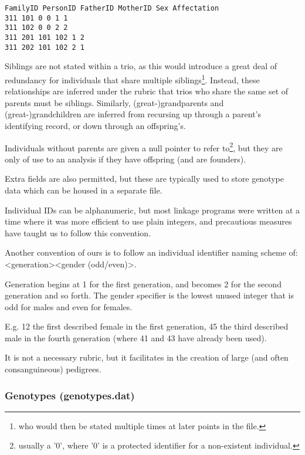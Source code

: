 \begingroup
\begin{lstlisting}[label=verb:pedfile]
FamilyID PersonID FatherID MotherID Sex Affectation
311 101 0 0 1 1
311 102 0 0 2 2
311 201 101 102 1 2
311 202 101 102 2 1
\end{lstlisting}
\endgroup

Siblings are not stated within a trio, as this would introduce a great deal of redundancy for individuals that share multiple siblings\footnote{who would then be stated multiple times at later points in the file.}. Instead, these relationships are inferred under the rubric that trios who share the same set of parents must be siblings. Similarly, (great-)grandparents and (great-)grandchildren are inferred from recursing up through a parent's identifying record, or down through an offspring's.

Individuals without parents are given a null pointer to refer to\footnote{usually a '0', where '0' is a protected identifier for a non-existent individual.}, but they are only of use to an analysis if they have offspring (and are founders).


Extra fields are also permitted, but these are typically used to store genotype data which can be housed in a separate file.

Individual IDs can be alphanumeric, but most linkage programs were written at a time where it was more efficient to use plain integers, and precautious measures have taught us to follow this convention.

Another convention of ours is to follow an individual identifier naming scheme of: <generation><gender (odd/even)>.

Generation begins at 1 for the first generation, and becomes 2 for the second generation and so forth. The gender specifier is the lowest unused integer that is odd for males and even for females.

E.g. 12 the first described female in the first generation, 45 the third described male in the fourth generation (where 41 and 43 have already been used).

It is not a necessary rubric, but it facilitates in the creation of large (and often consanguineous) pedigrees.

\subsubsection{Genotypes (genotypes.dat)}

